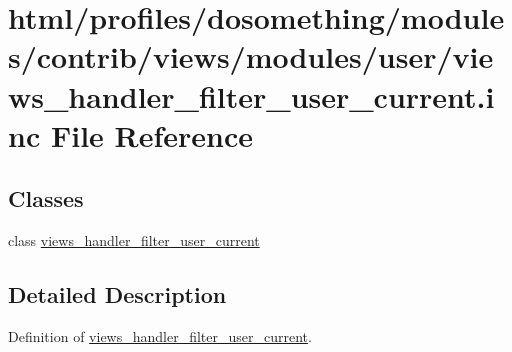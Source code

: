 \hypertarget{views__handler__filter__user__current_8inc}{
\section{html/profiles/dosomething/modules/contrib/views/modules/user/views\_\-handler\_\-filter\_\-user\_\-current.inc File Reference}
\label{views__handler__filter__user__current_8inc}
}
\subsection*{Classes}
\begin{DoxyCompactItemize}
\item 
class \hyperlink{classviews__handler__filter__user__current}{views\_\-handler\_\-filter\_\-user\_\-current}
\end{DoxyCompactItemize}


\subsection{Detailed Description}
Definition of \hyperlink{classviews__handler__filter__user__current}{views\_\-handler\_\-filter\_\-user\_\-current}. 